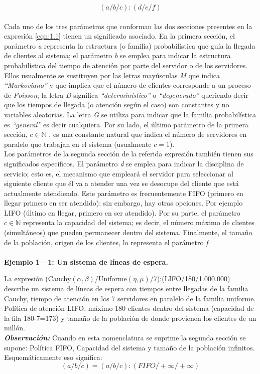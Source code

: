 \begin{equation}
    \left( a/b/c \right) :\left( d/e/f \right)
    \label{eqn:1.1}
\end{equation}
\\
Cada uno de los tres parámetros que conforman las dos secciones presentes en la expresión \ref{eqn:1.1}
tienen un significado asociado. En la primera sección, el parámetro {\em a} representa la estructura (o familia) probabilística que guía la llegada de clientes al sistema; el parámetro {\em b} se emplea para
indicar la estructura probabilística del tiempo de atención por parte del servidor o de los servidores.
Ellos usualmente se sustituyen por las letras mayúsculas {\em M} que indica {\em “Markoviano”} y que implica que el número de clientes corresponde a un proceso de {\em Poisson}; la letra
{\em D} significa {\em “determinístico”} o {\em “degenerado”} queriendo decir que los tiempos de llegada (o atención según el caso) son constantes y no variables aleatorias. La letra {\em G} se utiliza para indicar que la familia probabilística es {\em “general”} es decir cualquiera. Por su lado, el último parámetro de la primera sección, \(c \in \mathbb{N}\)
, es una constante natural que indica el número de servidores en paralelo que trabajan
en el sistema (usualmente $ c = 1 $).
\\
Los parámetros de la segunda sección de la referida expresión también tienen sus significados
específicos. El parámetro {\em d} se emplea para indicar la disciplina de servicio; esto es, el mecanismo
que empleará el servidor para seleccionar al siguiente cliente que él va a atender una vez se
desocupe del cliente que está actualmente atendiendo. Este parámetro es frecuentemente FIFO
(primero en llegar primero en ser atendido); sin embargo, hay otras opciones. Por ejemplo LIFO
(último en llegar, primero en ser atendido). Por su parte, el parámetro $ c \in \mathbb{N} $ representa la capacidad del sistema; es decir, el número máximo de clientes (simultáneos) que pueden permanecer dentro del
sistema. Finalmente, el tamaño de la población, origen de los clientes, lo representa el parámetro {\em f}.
\\
\\
\textbf{Ejemplo 1—1: Un sistema de líneas de espera.}

La expresión (Cauchy$(\alpha,\beta )$/Uniforme$( \eta ,\mu  )$/7):(LIFO/180/1.000.000) describe un sistema de líneas de espera con tiempos entre llegadas de la familia Cauchy, tiempo de atención en los 7 servidores en paralelo de la familia uniforme. Política de atención LIFO, máximo 180 clientes dentro del sistema (capacidad de la fila 180-7=173) y tamaño de la población de donde provienen los clientes de un millón.
\\
\textbf{\textit{Observación:}}
Cuando en esta nomenclatura se suprime la segunda sección se supone: Política FIFO, Capacidad
del sistema y tamaño de la población infinitos. Esquemáticamente eso significa:
\begin{equation}
    \left ( a/b/c \right ) = \left ( a/b/c \right ) : \left ( FIFO/+\infty/+\infty\right )
    \label{eqn:1.2}
\end{equation}

